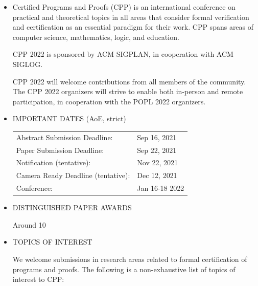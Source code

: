\documentclass[prodmode,acmtecs]{acmsmall} %
\begin{document}
\begin{itemize}\item  Certified Programs and Proofs (CPP) is an international conference on practical and theoretical topics in all areas that consider formal verification and certification as an essential paradigm for their work. CPP spans areas of computer science, mathematics, logic, and education. 
 
  CPP 2022 is sponsored by ACM SIGPLAN, in cooperation with ACM SIGLOG. 
 
  CPP 2022 will welcome contributions from all members of the community. The CPP 2022 organizers will strive to enable both in-person and remote participation, in cooperation with the POPL 2022 organizers.  
 
\item  IMPORTANT DATES (AoE, strict) 
 
\begin{tabulary}{\linewidth}{LL}Abstract Submission Deadline:  & Sep 16, 2021 \\
Paper Submission Deadline:  & Sep 22, 2021 \\
Notification (tentative):  & Nov 22, 2021 \\
Camera Ready Deadline (tentative):  & Dec 12, 2021 \\
Conference:  & Jan 16-18 2022 \\
\end{tabulary}
 
\item  DISTINGUISHED PAPER AWARDS 
 
  Around 10%
 
\item  TOPICS OF INTEREST 
 
  We welcome submissions in research areas related to formal certification of programs and proofs. The following is a non-exhaustive list of topics of interest to CPP:  
 

\end{itemize}
\end{document}
